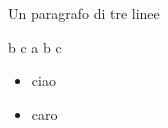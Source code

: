 \documentclass{article}
\begin{document}
Un paragrafo
di
tre linee


b
c
a
b
c



\begin{itemize}  
\item ciao
\item caro
\end{itemize}

\end{document}
